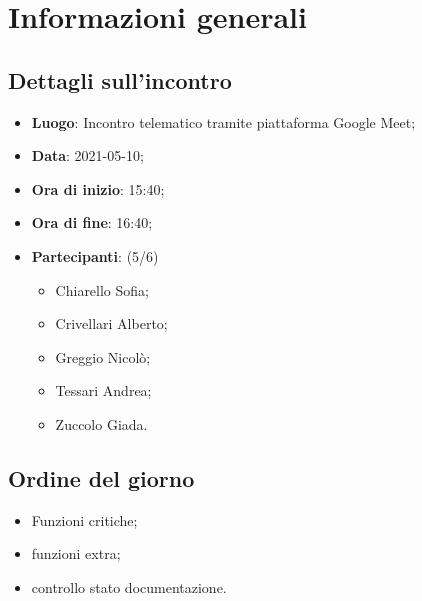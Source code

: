 \section{Informazioni generali}

\subsection{Dettagli sull'incontro}
\begin{itemize}
\item \textbf{Luogo}: Incontro telematico tramite piattaforma Google Meet;
\item \textbf{Data}: 2021-05-10;
\item \textbf{Ora di inizio}: 15:40;
\item \textbf{Ora di fine}: 16:40;
\item \textbf{Partecipanti}: (5/6) 
\begin{itemize}
	\item Chiarello Sofia;
	\item Crivellari Alberto;
	\item Greggio Nicolò;
	\item Tessari Andrea;
	\item Zuccolo Giada.
\end{itemize}
\end{itemize}

\subsection{Ordine del giorno}
\begin{itemize}
	\item Funzioni critiche;
	\item funzioni extra;
	\item controllo stato documentazione.
\end{itemize}


